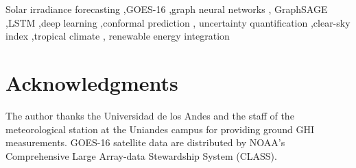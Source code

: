 \documentclass[review]{elsarticle}
\begin{document}
\begin{frontmatter}
\begin{abstract}
El~Paso; $0.417 \pm 0.008$ vs.\ $0.368 \pm 0.019$ at Uniandes), with
consistently lower seed-to-seed variance --- while the markedly lower absolute
skill at the high-altitude site indicates that site-specific cloud dynamics
should inform model selection in operational forecasting pipelines.
Split Conformal Prediction is applied as a
post-hoc UQ layer, providing finite-sample marginal coverage guarantees
without distributional assumptions. This work establishes a reproducible
GOES-16 benchmark for tropical Andean sites --- a climate regime markedly
underrepresented in the solar forecasting literature --- and lays the
foundation for a staged UQ roadmap toward adaptive-width intervals and
aleatoric/epistemic uncertainty decomposition.
\end{abstract}

\begin{keyword}
Solar irradiance forecasting \sep GOES-16 \sep graph neural networks \sep
GraphSAGE \sep LSTM \sep deep learning \sep conformal prediction \sep
uncertainty quantification \sep clear-sky index \sep tropical climate \sep
renewable energy integration
\end{keyword}

\end{frontmatter}

\linenumbers








\section*{Acknowledgments}
The author thanks the Universidad de los Andes and the staff of the meteorological
station at the Uniandes campus for providing ground GHI measurements.
GOES-16 satellite data are distributed by NOAA's Comprehensive Large Array-data
Stewardship System (CLASS).



\end{document}
